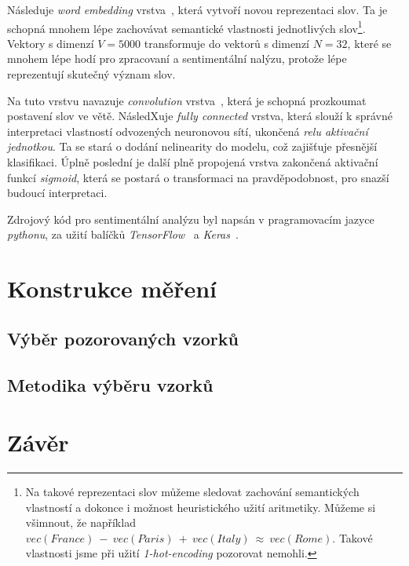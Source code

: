 \documentclass[12pt, a4paper]{article}
\numberwithin{equation}{section} 	%
\begin{document}
Následuje \textit{word embedding} vrstva~\cite{WordEmbedding1, WordEmbedding2}, která vytvoří novou reprezentaci slov. Ta je schopná mnohem lépe zachovávat semantické vlastnosti jednotlivých slov\footnote{Na takové reprezentaci slov můžeme sledovat zachování semantických vlastností a dokonce i možnost heuristického užití aritmetiky. Můžeme si všimnout, že například $vec(\textit{France})~-~vec(\textit{Paris})~+~vec(\textit{Italy})~\approx~vec(\textit{Rome})$. Takové vlastnosti jsme při užití \textit{1-hot-encoding} pozorovat nemohli.}. Vektory s dimenzí $V = 5000$ transformuje do vektorů s dimenzí $N = 32$, které se mnohem lépe hodí pro zpracovaní a sentimentální nalýzu, protože lépe reprezentují skutečný význam slov.

Na tuto vrstvu navazuje \textit{convolution} vrstva~\cite{CNN}, která je schopná prozkoumat postavení slov ve větě. NásledXuje \textit{fully connected} vrstva, která slouží k správné interpretaci vlastností odvozených neuronovou sítí, ukončená \textit{relu aktivační jednotkou}. Ta se stará o dodání nelinearity do modelu, což zajišťuje přesnější klasifikaci. Úplně poslední je další plně propojená vrstva zakončená aktivační funkcí \textit{sigmoid}, která se postará o transformaci na pravděpodobnost, pro snazší budoucí interpretaci.

Zdrojový kód pro sentimentální analýzu byl napsán v pragramovacím jazyce \textit{pythonu}, za užití balíčků \textit{TensorFlow}~\cite{TensorFlow} a \textit{Keras}~\cite{keras}.


\newpage
\section{Konstrukce měření}
\subsection{Výběr pozorovaných vzorků}
\subsection{Metodika výběru vzorků}





\newpage
\section{Závěr}
\noindent
\end{document}
